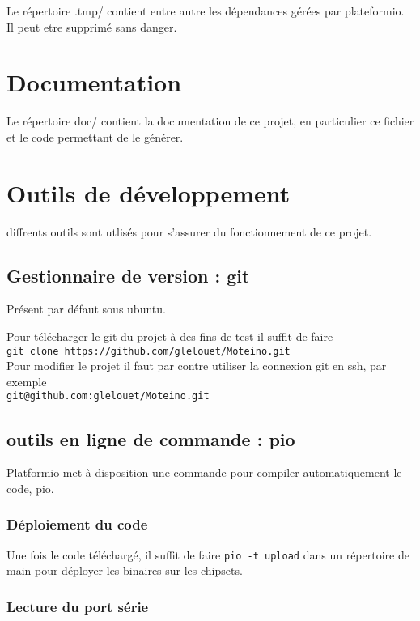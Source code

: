 \documentclass{report}
\begin{document}
Le répertoire .tmp/ contient entre autre les dépendances gérées par plateformio. Il peut etre supprimé sans danger.

\section{Documentation}

Le répertoire doc/ contient la documentation de ce projet, en particulier ce fichier et le code permettant de le générer.

\section{Outils de développement}

diffrents outils sont utlisés pour s'assurer du fonctionnement de ce projet.

\subsection{Gestionnaire de version : git}

Présent par défaut sous ubuntu.

Pour télécharger le git du projet à des fins de test il suffit de faire\\
\verb+git clone https://github.com/glelouet/Moteino.git+\\

Pour modifier le projet il faut par contre utiliser la connexion git en ssh, par exemple\\
\verb+git@github.com:glelouet/Moteino.git+

\subsection{outils en ligne de commande : pio}

Platformio met à disposition une commande pour compiler automatiquement le code, pio.

\subsubsection{Déploiement du code}

Une fois le code téléchargé, il suffit de faire \verb+pio -t upload+ dans un répertoire de main pour déployer les binaires sur les chipsets.

\subsubsection{Lecture du port série}
\end{document}
